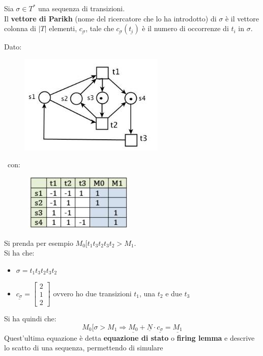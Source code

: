 \documentclass[a4paper,12pt, oneside]{book}
\begin{document}
\begin{definizione}
  Sia $\sigma \in T^*$ una sequenza di transizioni.\\
  Il \textbf{vettore di Parikh} (nome del ricercatore che lo ha introdotto) di
  $\sigma$ è il vettore colonna di $|T|$ elementi, $\underline{c_\sigma}$, tale
  che $\underline{c_\sigma}(\underline{t_i})$ è il numero di occorrenze di $t_i$
  in $\sigma$.
  \begin{esempio}
    Dato:
    \begin{figure}[H]
      \centering
      \includegraphics[scale = 0.6]{img/al4.jpg}
    \end{figure}
    \    con:
    \begin{figure}[H]
      \centering
      \      \includegraphics[scale = 0.6]{img/al5.jpg}
    \end{figure}
    Si prenda per esempio $M_0[t_1t_3t_2t_3t_2>M_1$.\\
    Si ha che:
    \begin{itemize}
      \item $\sigma=t_1t_3t_2t_3t_2$
      \item $\underline{c_\sigma}=\left[\begin{matrix}
          2\\
          1\\
          2
        \end{matrix}\right]$
      ovvero ho due transizioni $t_1$, una $t_2$ e due $t_3$
    \end{itemize}
    Si ha quindi che:
    \[M_0[\sigma >M_1\Longrightarrow
      \underline{M_0}+\underline{N}\cdot\underline{c_\sigma}=\underline{M_1}\]
    Quest'ultima equazione è detta \textbf{equazione di stato} o \textbf{firing
      lemma} e descrive lo scatto di una sequenza, permettendo di simulare

\end{esempio}
\end{definizione}
\end{document}
